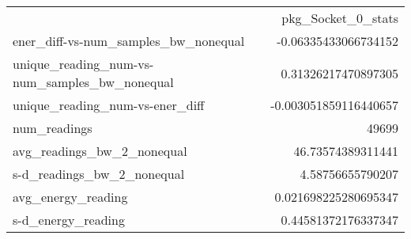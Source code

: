 \begin{tabular}{lr}
\toprule
{} &   pkg_Socket_0_stats \\
ener_diff-vs-num_samples_bw_nonequal & -0.06335433066734152 \\
unique_reading_num-vs-num_samples_bw_nonequal & 0.31326217470897305 \\
unique_reading_num-vs-ener_diff & -0.003051859116440657 \\
num_readings & 49699 \\
avg_readings_bw_2_nonequal & 46.73574389311441 \\
s-d_readings_bw_2_nonequal & 4.58756655790207 \\
avg_energy_reading & 0.021698225280695347 \\
s-d_energy_reading & 0.44581372176337347 \\
\bottomrule
\end{tabular}